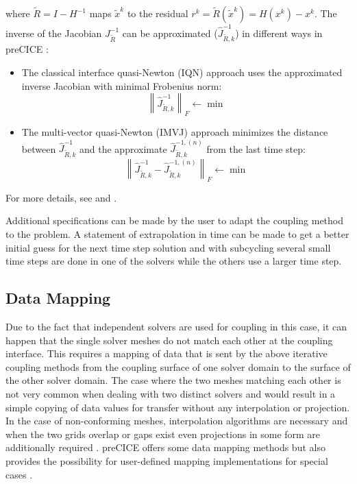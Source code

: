    where $\tilde{R} = I-H^{-1}$ maps $\tilde{x}^k$ to the residual $r^k=\tilde{R}(\tilde{x}^k)=H(x^k)-x^k$. The inverse of the Jacobian $J_{\tilde{R}}^{-1}$ can be approximated ($\hat{J}_{\tilde{R},k}^{-1}$) in different ways in preCICE \cite{bungartz2015fully}:
   \begin{itemize}
   	\item The classical interface quasi-Newton (IQN) approach uses the approximated inverse Jacobian with minimal Frobenius norm:
   	\begin{equation}
   	\left\| \hat{J}_{\tilde{R},k}^{-1} \right\|_F \leftarrow \min
   	\end{equation}
   	\item The multi-vector quasi-Newton (IMVJ) approach minimizes the distance between $\hat{J}_{\tilde{R},k}^{-1}$ and the approximate $\hat{J}_{\tilde{R},k}^{-1,(n)}$ from the last time step:
   	\begin{equation}
   	\left\| \hat{J}_{\tilde{R},k}^{-1} - \hat{J}_{\tilde{R},k}^{-1,(n)}\right\|_F \leftarrow \min
   	\end{equation}
   \end{itemize}
   For more details, see \cite{bungartz2015fully} and \cite{gatzhammer2015efficient}.
   
   Additional specifications can be made by the user to adapt the coupling method to the problem. A statement of extrapolation in time can be made to get a better initial guess for the next time step solution and with subcycling several small time steps are done in one of the solvers while the others use a larger time step.
  

 \subsection{Data Mapping} \label{sec:Coupl-DataMapping}
  Due to the fact that independent solvers are used for coupling in this case, it can happen that the single solver meshes do not match each other at the coupling interface. This requires a mapping of data that is sent by the above iterative coupling methods from the coupling surface of one solver domain to the surface of the other solver domain. The case where the two meshes matching each other is not very common when dealing with two distinct solvers and would result in a simple copying of data values for transfer without any interpolation or projection. In the case of non-conforming meshes, interpolation algorithms are necessary and when the two grids overlap or gaps exist even projections in some form are additionally required \cite{gatzhammer2015efficient}. preCICE offers some data mapping methods but also provides the possibility for user-defined mapping implementations for special cases \cite{bungartz2015fully}.
